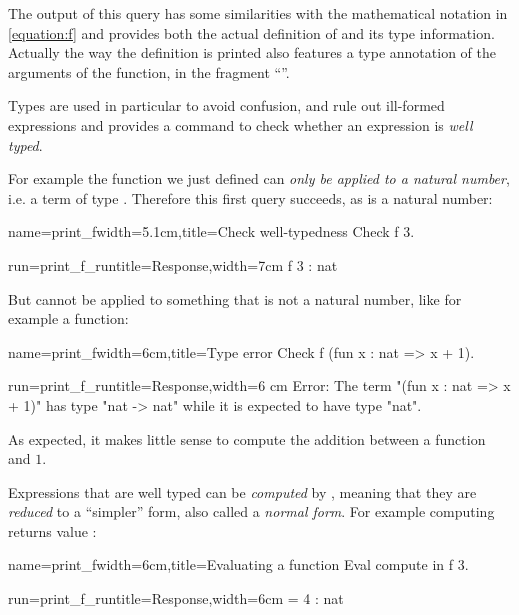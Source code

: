 The output of this  query has some similarities with the
 mathematical notation in \eqref{equation:f} and provides both the
 actual definition of  and its type information. Actually the way
 the definition is printed also features a type annotation of the
 arguments of the function, in the fragment ``''.

Types are used in particular to avoid confusion, and rule out
ill-formed expressions and \Coq{} provides a command to check whether
an expression is \emph{well typed}.

For example the function  we just defined can \emph{only be
  applied to a natural number}, i.e. a term of type . Therefore
this first query succeeds, as  is a natural number:

\begin{coq}{name=print_f}{width=5.1cm,title=Check well-typedness}
Check f 3.
\end{coq}
\begin{coqout}{run=print_f_run}{title=Response,width=7cm}
 f 3 : nat
\end{coqout}
But  cannot be applied to something that is not a natural number,
like for example a function:

\begin{coq}{name=print_f}{width=6cm,title=Type error}
Check f (fun x : nat => x + 1).
$~$
$~$
\end{coq}
\begin{coqout}{run=print_f_run}{title=Response,width=6
cm}
Error:
The term "(fun x : nat => x + 1)"
has type "nat -> nat" while it is
expected to have type "nat".
\end{coqout}
As expected, it makes little sense to compute the addition between
a function and $1$.

Expressions that are well typed can be \emph{computed} by \Coq{},
meaning that they are \emph{reduced} to a ``simpler'' form, also
called a \emph{normal form}. For example computing  returns
value :

\begin{coq}{name=print_f}{width=6cm,title=Evaluating a function}
Eval compute in f 3.
\end{coq}
\begin{coqout}{run=print_f_run}{title=Response,width=6cm}
 = 4 : nat
\end{coqout}

